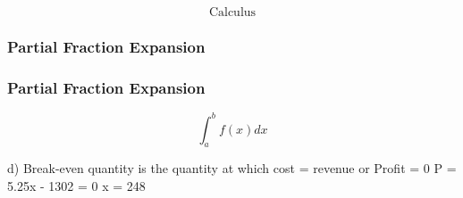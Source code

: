 \documentclass{beamer}
\begin{document}
\begin{frame}
\Large
\[\mbox{Calculus}\]
\end{frame}
\begin{frame}
\frametitle{Partial Fraction Expansion}
\end{frame}
\begin{frame}

\frametitle{Partial Fraction Expansion}
\LARGE
\[ \int^b_a f(x) dx \]

\end{frame}
\begin{frame}
d) Break-even quantity is the quantity at which cost = revenue or Profit = 0
P = 5.25x - 1302 = 0
x = 248

\end{frame}
\end{document}
